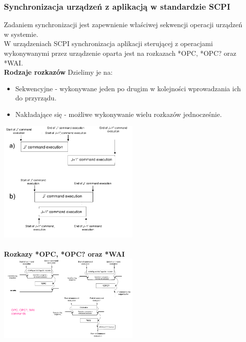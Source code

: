 \subsubsection{Synchronizacja urządzeń z aplikacją w standardzie SCPI}
Zadaniem synchronizacji jest zapewnienie właściwej sekwencji operacji urządzeń w systemie.\\
W urządzeniach SCPI synchronizacja aplikacji sterującej z operacjami wykonywanymi przez urządzenie oparta jest na rozkazach *OPC, *OPC? oraz *WAI.\\
\textbf{Rodzaje rozkazów}
Dzielimy je na:
\begin{itemize}
	\item Sekwencyjne - wykonywane jeden po drugim w kolejności wprowadzania ich do przyrządu.
	\item Nakładające się - możliwe wykonywanie wielu rozkazów jednocześnie.
\end{itemize}
\includegraphics[width=7cm]{./wyklady/IEEE488_SCPI_37_1.pdf}\\\\
\textbf{Rozkazy *OPC, *OPC? oraz *WAI}\\
\includegraphics[width=7cm]{./wyklady/IEEE488_SCPI_38_1.pdf}

